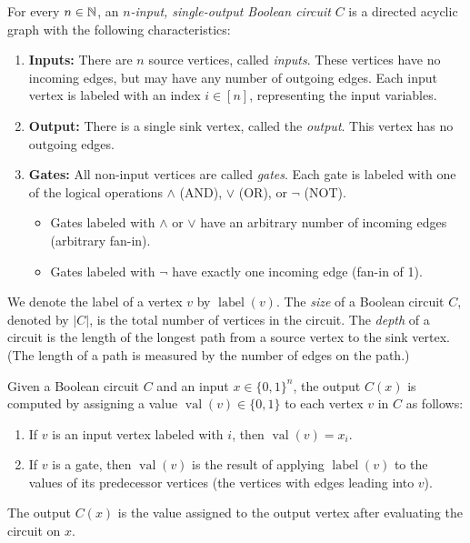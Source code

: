 \documentclass{article}
\begin{document}
\begin{definition}
\label{def:BooleanCircuits}
For every $n \in \mathbb{N}$, an \emph{$n$-input, single-output Boolean circuit} $C$ is a directed acyclic graph with the following characteristics:

\begin{enumerate}
    \item \textbf{Inputs:} There are $n$ source vertices, called \emph{inputs}. These vertices have no incoming edges, but may have any number of outgoing edges. Each input vertex is labeled with an index $i \in [n]$, representing the input variables.
    \item \textbf{Output:} There is a single sink vertex, called the \emph{output}. This vertex has no outgoing edges.
    \item \textbf{Gates:} All non-input vertices are called \emph{gates}. Each gate is labeled with one of the logical operations $\land$ (AND), $\lor$ (OR), or $\neg$ (NOT).
    \begin{itemize}
        \item Gates labeled with $\land$ or $\lor$ have an arbitrary number of incoming edges (arbitrary fan-in).
        \item Gates labeled with $\neg$ have exactly one incoming edge (fan-in of 1).
    \end{itemize}
\end{enumerate}

We denote the label of a vertex $v$ by $\operatorname{label}(v)$. 
The \emph{size} of a Boolean circuit $C$, denoted by $|C|$, is the total number of vertices in the circuit.
The \emph{depth} of a circuit is the length of the longest path from a source vertex to the sink vertex.
(The length of a path is measured by the number of edges on the path.)

Given a Boolean circuit $C$ and an input $x \in \{0, 1\}^n$, the output $C(x)$ is computed by assigning a value $\operatorname{val}(v) \in \{0,1\}$ to each vertex $v$ in $C$ as follows:

\begin{enumerate}
    \item If $v$ is an input vertex labeled with $i$, then $\operatorname{val}(v) = x_i$.
    \item If $v$ is a gate, then $\operatorname{val}(v)$ is the result of applying $\operatorname{label}(v)$ to the values of its predecessor vertices (the vertices with edges leading into $v$).
\end{enumerate}

The output $C(x)$ is the value assigned to the output vertex after evaluating the circuit on $x$.
\end{definition}
\end{document}
